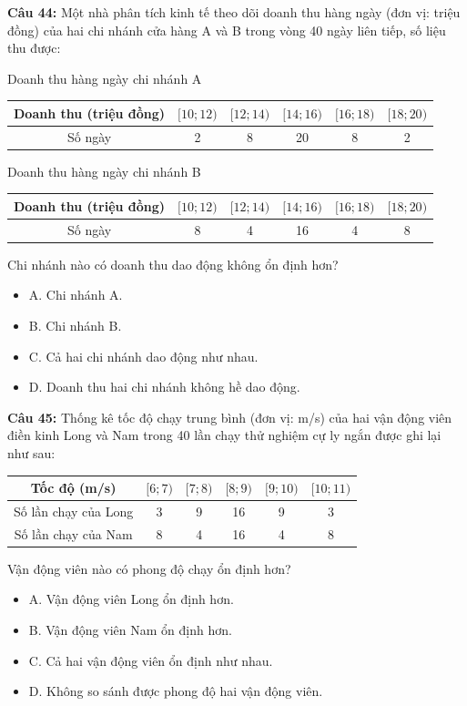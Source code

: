 \documentclass[12pt]{article}
\begin{document}
	\vspace{4mm}
	
	\noindent \textbf{Câu 44:} Một nhà phân tích kinh tế theo dõi doanh thu hàng ngày (đơn vị: triệu đồng) của hai chi nhánh cửa hàng A và B trong vòng 40 ngày liên tiếp, số liệu thu được:
	\begin{center}
		Doanh thu hàng ngày chi nhánh A
		\renewcommand{\arraystretch}{1.3}
		\begin{tabular}{|c|c|c|c|c|c|}
			\hline
			Doanh thu (triệu đồng) & $[10; 12)$ & $[12; 14)$ & $[14; 16)$ & $[16; 18)$ & $[18; 20)$ \\
			\hline
			Số ngày & 2 & 8 & 20 & 8 & 2 \\
			\hline
		\end{tabular}
	\end{center}
	\begin{center}
		Doanh thu hàng ngày chi nhánh B
		\renewcommand{\arraystretch}{1.3}
		\begin{tabular}{|c|c|c|c|c|c|}
			\hline
			Doanh thu (triệu đồng) & $[10; 12)$ & $[12; 14)$ & $[14; 16)$ & $[16; 18)$ & $[18; 20)$ \\
			\hline
			Số ngày & 8 & 4 & 16 & 4 & 8 \\
			\hline
		\end{tabular}
	\end{center}
	Chi nhánh nào có doanh thu dao động không ổn định hơn?
	\begin{itemize}[label=, leftmargin=*]
		\item A. Chi nhánh A.
		\item B. Chi nhánh B.
		\item C. Cả hai chi nhánh dao động như nhau.
		\item D. Doanh thu hai chi nhánh không hề dao động.
	\end{itemize}
	
	\vspace{4mm}
	
	\noindent \textbf{Câu 45:} Thống kê tốc độ chạy trung bình (đơn vị: m/s) của hai vận động viên điền kinh Long và Nam trong 40 lần chạy thử nghiệm cự ly ngắn được ghi lại như sau:
	\begin{center}
		\renewcommand{\arraystretch}{1.3}
		\begin{tabular}{|c|c|c|c|c|c|}
			\hline
			Tốc độ (m/s) & $[6; 7)$ & $[7; 8)$ & $[8; 9)$ & $[9; 10)$ & $[10; 11)$ \\
			\hline
			Số lần chạy của Long & 3 & 9 & 16 & 9 & 3 \\
			\hline
			Số lần chạy của Nam & 8 & 4 & 16 & 4 & 8 \\
			\hline
		\end{tabular}
	\end{center}
	Vận động viên nào có phong độ chạy ổn định hơn?
	\begin{itemize}[label=, leftmargin=*]
		\item A. Vận động viên Long ổn định hơn.
		\item B. Vận động viên Nam ổn định hơn.
		\item C. Cả hai vận động viên ổn định như nhau.
		\item D. Không so sánh được phong độ hai vận động viên.
	\end{itemize}
	
\end{document}
